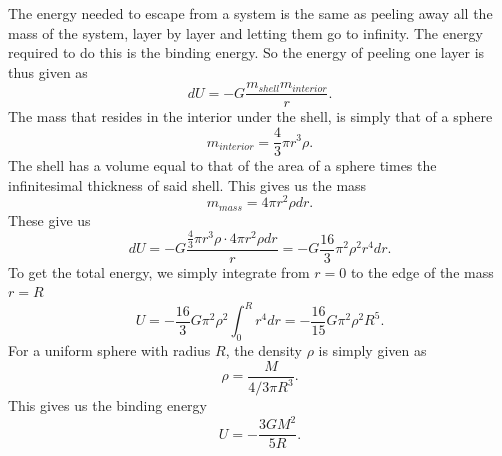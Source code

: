 \documentclass[a4paper,norsk, 10pt]{article}
\begin{document}
The energy needed to escape from a system is the same as peeling away all the mass of the system, layer by layer and letting them go to infinity. The energy required to do this is the binding energy. So the energy of peeling one layer is thus given as
\begin{equation}
dU = - G\frac{m_{shell}m_{interior}}{r}.
\end{equation}
The mass that resides in the interior under the shell, is simply that of a sphere
\begin{equation}
m_{interior} = \frac{4}{3}\pi r^3 \rho.
\end{equation}
The shell has a volume equal to that of the area of a sphere times the infinitesimal thickness of said shell. This gives us the mass
\begin{equation}
m_{mass} = 4\pi r^2\rho dr.
\end{equation}
These give us
\begin{equation}
dU = - G\frac{\frac{4}{3}\pi r^3 \rho\cdot 4\pi r^2\rho dr}{r} = -G\frac{16}{3}\pi^2\rho^2 r^4 dr.
\end{equation}
To get the total energy, we simply integrate from $r=0$ to the edge of the mass $r=R$
\begin{equation}
U = -\frac{16}{3}G\pi^2\rho^2 \int_0^R r^4 dr = -\frac{16}{15}G\pi^2\rho^2 R^5.
\end{equation}
For a uniform sphere with radius $R$, the density $\rho$ is simply given as
\begin{equation}
\rho = \frac{M}{4/3 \pi R^3}.
\end{equation}
This gives us the binding energy
\begin{equation}
U = -\frac{3GM^2}{5R}.
\end{equation}
\end{document}
